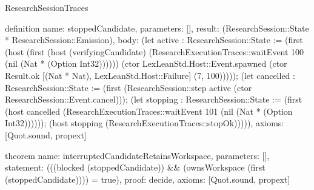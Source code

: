 \begin{lexlean}{ResearchSessionTraces}
\begin{semanticmodule}
definition{
 name: stoppedCandidate,
 parameters: [],
 result: (ResearchSession::State * ResearchSession::Emission),
 body: (let active : ResearchSession::State := (first (host (first (host (verifyingCandidate) (ResearchExecutionTraces::waitEvent 100 (nil (Nat * (Option Int32)))))) (ctor LexLeanStd.Host::Event.spawned (ctor Result.ok [(Nat * Nat), LexLeanStd.Host::Failure] (7, 100))))); (let cancelled : ResearchSession::State := (first (ResearchSession::step active (ctor ResearchSession::Event.cancel))); (let stopping : ResearchSession::State := (first (host cancelled (ResearchExecutionTraces::waitEvent 101 (nil (Nat * (Option Int32)))))); (host stopping (ResearchExecutionTraces::stopOk))))),
 axioms: [Quot.sound, propext]
}

theorem{
 name: interruptedCandidateRetainsWorkspace,
 parameters: [],
 statement: (((blocked (stoppedCandidate)) && (ownsWorkspace (first (stoppedCandidate)))) = true),
 proof: decide{},
 axioms: [Quot.sound, propext]
}

\end{semanticmodule}
\end{lexlean}
